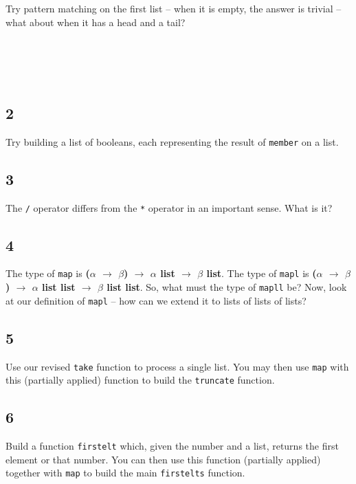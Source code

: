 \documentclass[]{book}
\begin{document}
\begin{multicols*}{2}
Try pattern matching on the first list -- when it is empty, the answer is trivial -- what about when it has a head and a tail?

\section*{\\ }

\subsection*{2}
Try building a list of booleans, each representing the result of \texttt{member} on a list.

\subsection*{3}
The \texttt{/} operator differs from the \texttt{*} operator in an important sense. What is it?

\subsection*{4}
The type of \texttt{map} is \textbf{\textsf{\textmd{(}$\alpha$ $\rightarrow$ $\beta$\textmd{)} $\rightarrow$ $\alpha$ list $\rightarrow$ $\beta$ list}}. The type of \texttt{mapl} is \textbf{\textsf{\textmd{(}$\alpha$ $\rightarrow$ $\beta$\textmd{)} $\rightarrow$ $\alpha$ list list $\rightarrow$ $\beta$ list list}}. So, what must the type of \texttt{mapll} be? Now, look at our definition of \texttt{mapl} -- how can we extend it to lists of lists of lists?

\subsection*{5}
Use our revised \texttt{take} function to process a single list. You may then use \texttt{map} with this (partially applied) function to build the \texttt{truncate} function.

\subsection*{6}
Build a function \texttt{firstelt} which, given the number and a list, returns the first element or that number. You can then use this function (partially applied) together with \texttt{map} to build the main \texttt{firstelts} function.


\end{multicols*}
\end{document}
